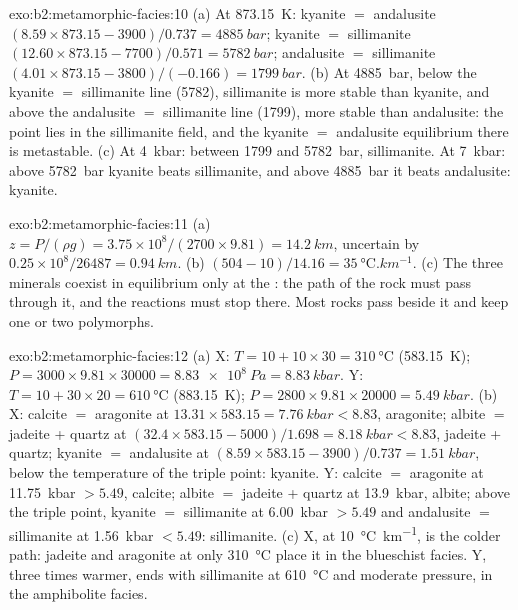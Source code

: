 \begin{solution}{exo:b2:metamorphic-facies:10}
(a) At \qty{873.15}{K}: kyanite $=$ andalusite $(8.59\times873.15 - 3900)/0.737 =
\qty{4885}{bar}$; kyanite $=$ sillimanite $(12.60\times873.15 - 7700)/0.571 =
\qty{5782}{bar}$; andalusite $=$ sillimanite $(4.01\times873.15 - 3800)/(-0.166) =
\qty{1799}{bar}$. (b) At \qty{4885}{bar}, below the kyanite $=$ sillimanite line (5782),
sillimanite is more stable than kyanite, and above the andalusite $=$ sillimanite line
(1799), more stable than andalusite: the point lies in the sillimanite field, and the
kyanite $=$ andalusite equilibrium there is metastable. (c) At \qty{4}{kbar}: between 1799
and \qty{5782}{bar}, sillimanite. At \qty{7}{kbar}: above \qty{5782}{bar} kyanite beats
sillimanite, and above \qty{4885}{bar} it beats andalusite: kyanite.
\end{solution}

\begin{solution}{exo:b2:metamorphic-facies:11}
(a) $z = P/(\rho g) = 3.75\times10^8/(2700\times9.81) = \qty{14.2}{km}$, uncertain by
$0.25\times10^8/26487 = \qty{0.94}{km}$. (b) $(504 - 10)/14.16 =
\qty{35}{\celsius.km^{-1}}$. (c) The three minerals coexist in equilibrium only at the
: the path of the rock must pass through it, and the reactions must
stop there. Most rocks pass beside it and keep one or two polymorphs.
\end{solution}

\begin{solution}{exo:b2:metamorphic-facies:12}
(a) X: $T = 10 + 10\times30 = \qty{310}{\celsius}$ (\qty{583.15}{K}); $P = 3000\times
9.81\times30000 = \qty{8.83e8}{Pa} = \qty{8.83}{kbar}$. Y: $T = 10 + 30\times20 =
\qty{610}{\celsius}$ (\qty{883.15}{K}); $P = 2800\times9.81\times20000 = \qty{5.49}{kbar}$.
(b) X: calcite $=$ aragonite at $13.31\times583.15 = \qty{7.76}{kbar} < 8.83$, aragonite;
albite $=$ jadeite + quartz at $(32.4\times583.15 - 5000)/1.698 = \qty{8.18}{kbar} <
8.83$, jadeite + quartz; kyanite $=$ andalusite at $(8.59\times583.15 - 3900)/0.737 =
\qty{1.51}{kbar}$, below the temperature of the triple point: kyanite. Y: calcite $=$
aragonite at \qty{11.75}{kbar} $> 5.49$, calcite; albite $=$ jadeite + quartz at
\qty{13.9}{kbar}, albite; above the triple point, kyanite $=$ sillimanite at
\qty{6.00}{kbar} $> 5.49$ and andalusite $=$ sillimanite at \qty{1.56}{kbar} $< 5.49$:
sillimanite. (c) X, at \qty{10}{\celsius\per\km}, is the colder path: jadeite and
aragonite at only \qty{310}{\celsius} place it in the blueschist facies. Y, three times
warmer, ends with sillimanite at \qty{610}{\celsius} and moderate pressure, in the
amphibolite facies.
\end{solution}

